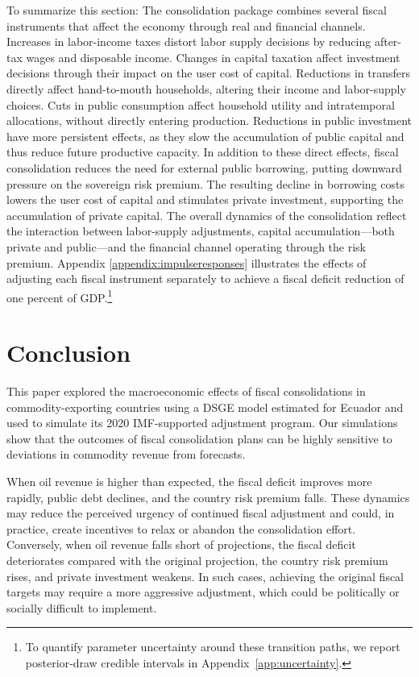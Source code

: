 \documentclass[12pt]{article}
\begin{document}
To summarize this section: The consolidation package combines several fiscal instruments that affect the economy through real and financial channels. Increases in labor-income taxes distort labor supply decisions by reducing after-tax wages and disposable income. Changes in capital taxation affect investment decisions through their impact on the user cost of capital. Reductions in transfers directly affect hand-to-mouth households, altering their income and labor-supply choices. Cuts in public consumption affect household utility and intratemporal allocations, without directly entering production. Reductions in public investment have more persistent effects, as they slow the accumulation of public capital and thus reduce future productive capacity. In addition to these direct effects, fiscal consolidation reduces the need for external public borrowing, putting downward pressure on the sovereign risk premium. The resulting decline in borrowing costs lowers the user cost of capital and stimulates private investment, supporting the accumulation of private capital. The overall dynamics of the consolidation reflect the interaction between labor-supply adjustments, capital accumulation—both private and public—and the financial channel operating through the risk premium. Appendix \ref{appendix:impulseresponses} illustrates the effects of adjusting each fiscal instrument separately to achieve a fiscal deficit reduction of one percent of GDP.\footnote{To quantify parameter uncertainty around these transition paths, we report posterior‑draw credible intervals in Appendix~\ref{app:uncertainty}.}

\section{Conclusion}\label{sec:conclusion}

This paper explored the macroeconomic effects of fiscal consolidations in commodity-exporting countries using a DSGE model estimated for Ecuador and used to simulate its 2020 IMF-supported adjustment program. Our simulations show that the outcomes of fiscal consolidation plans can be highly sensitive to deviations in commodity revenue from forecasts.

When oil revenue is higher than expected, the fiscal deficit improves more rapidly, public debt declines, and the country risk premium falls. These dynamics may reduce the perceived urgency of continued fiscal adjustment and could, in practice, create incentives to relax or abandon the consolidation effort. Conversely, when oil revenue falls short of projections, the fiscal deficit deteriorates compared with the original projection, the country risk premium rises, and private investment weakens. In such cases, achieving the original fiscal targets may require a more aggressive adjustment, which could be politically or socially difficult to implement.
\end{document}
